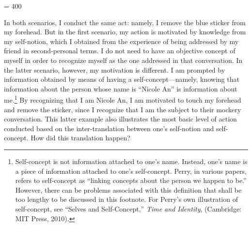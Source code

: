 \pretolerance = 400

In both scenarios, I conduct the same act: namely, I remove the blue
sticker from my forehead. But in the first scenario, my action is
motivated by knowledge from my self-notion, which I obtained from the
experience of being addressed by my friend in second-personal terms. I
do not need to have an objective concept of myself in order to recognize
myself as the one addressed in that conversation. In the latter
scenario, however, my motivation is different. I am prompted by
information obtained by means of having a self-concept---namely,
knowing that information about the person whose name is ``Nicole An'' is
information about me.\footnote{Self-concept is not information attached
  to one's name. Instead, one's name is a piece of information attached
  to one's self-concept. Perry, in various papers, refers to
  self-concept as ``linking concepts about the person we happen to be.''
  However, there can be problems associated with this definition that
  shall be too lengthy to be discussed in this footnote. For Perry's own
  illustration of self-concept, see ``Selves and Self-Concept,''
  \emph{Time and Identity}, (Cambridge: MIT Press, 2010).} By
recognizing that I am Nicole An, I am motivated to touch my forehead and
remove the sticker, since I recognize that I am the subject to their
mockery conversation. This latter example also illustrates the most
basic level of action conducted based on the inter-translation between
one's self-notion and self-concept. How did this translation happen?


